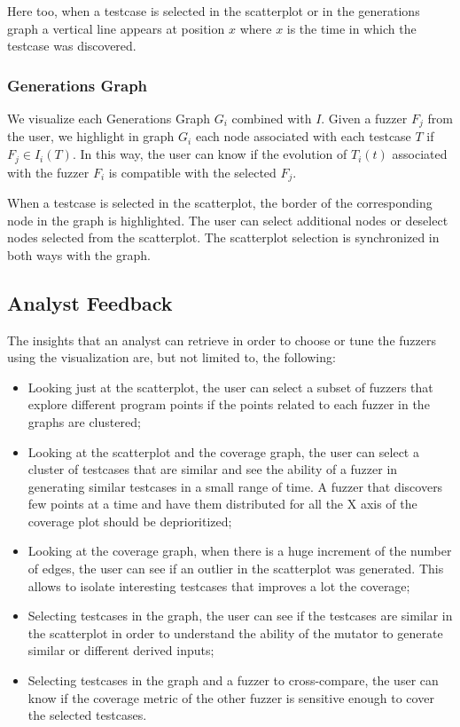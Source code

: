 \documentclass[conference,compsoc]{IEEEtran}
\begin{document}
Here too, when a testcase is selected in the scatterplot or in the generations graph a vertical line appears at position $x$ where $x$ is the time in which the testcase was discovered.

\subsubsection{Generations Graph}

We visualize each Generations Graph $G_i$ combined with $I$. Given a fuzzer $F_j$ from the user, we highlight in graph $G_i$ each node associated with each testcase $T$ if $F_j \in I_i(T)$. In this way, the user can know if the evolution of $T_i(t)$ associated with the fuzzer $F_i$ is compatible with the selected $F_j$.

When a testcase is selected in the scatterplot, the border of the corresponding node in the graph is highlighted. The user can select additional nodes or deselect nodes selected from the scatterplot. The scatterplot selection is synchronized in both ways with the graph.

\subsection{Analyst Feedback}

The insights that an analyst can retrieve in order to choose or tune the fuzzers using the visualization are, but not limited to, the following:

\begin{itemize}
\item Looking just at the scatterplot, the user can select a subset of fuzzers that explore different program points if the points related to each fuzzer in the graphs are clustered;
\item Looking at the scatterplot and the coverage graph, the user can select a cluster of testcases that are similar and see the ability of a fuzzer in generating similar testcases in a small range of time. A fuzzer that discovers few points at a time and have them distributed for all the X axis of the coverage plot should be deprioritized;
\item Looking at the coverage graph, when there is a huge increment of the number of edges, the user can see if an outlier in the scatterplot was generated. This allows to isolate interesting testcases that improves a lot the coverage;
\item Selecting testcases in the graph, the user can see if the testcases are similar in the scatterplot in order to understand the ability of the mutator to generate similar or different derived inputs;
\item Selecting testcases in the graph and a fuzzer to cross-compare, the user can know if the coverage metric of the other fuzzer is sensitive enough to cover the selected testcases.
\end{itemize}
\end{document}
